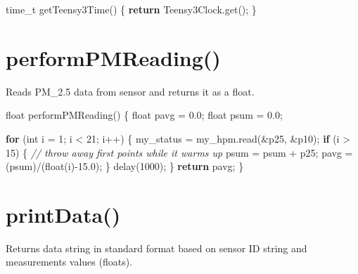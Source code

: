 \documentclass[]{book}
\newenvironment{Shaded}{\begin{snugshade}}{\end{snugshade}}
\newcommand{\CommentTok}[1]{\textcolor[rgb]{0.56,0.35,0.01}{\textit{#1}}}
\newcommand{\ControlFlowTok}[1]{\textcolor[rgb]{0.13,0.29,0.53}{\textbf{#1}}}
\newcommand{\DataTypeTok}[1]{\textcolor[rgb]{0.13,0.29,0.53}{#1}}
\newcommand{\DecValTok}[1]{\textcolor[rgb]{0.00,0.00,0.81}{#1}}
\newcommand{\FloatTok}[1]{\textcolor[rgb]{0.00,0.00,0.81}{#1}}
\newcommand{\NormalTok}[1]{#1}
\begin{document}
\begin{Shaded}
\begin{Highlighting}[]
\DataTypeTok{time_t}\NormalTok{ getTeensy3Time() \{}
  \ControlFlowTok{return}\NormalTok{ Teensy3Clock.get();}
\NormalTok{\}}
\end{Highlighting}
\end{Shaded}

\hypertarget{performpmreading}{%
\section*{performPMReading()}\label{performpmreading}}

Reads PM\_2.5 data from sensor and returns it as a float.

\begin{Shaded}
\begin{Highlighting}[]
\DataTypeTok{float}\NormalTok{ performPMReading() \{}
    \DataTypeTok{float}\NormalTok{ pavg = }\FloatTok{0.0}\NormalTok{;}
    \DataTypeTok{float}\NormalTok{ psum = }\FloatTok{0.0}\NormalTok{;}
    
    \ControlFlowTok{for}\NormalTok{ (}\DataTypeTok{int}\NormalTok{ i = }\DecValTok{1}\NormalTok{; i < }\DecValTok{21}\NormalTok{; i++) \{}
\NormalTok{      my_status = my_hpm.read(&p25, &p10);}
      \ControlFlowTok{if}\NormalTok{ (i > }\DecValTok{15}\NormalTok{) \{         }\CommentTok{// throw away first points while it warms up}
\NormalTok{          psum = psum + p25;}
\NormalTok{          pavg = (psum)/(}\DataTypeTok{float}\NormalTok{(i)-}\FloatTok{15.0}\NormalTok{);}
\NormalTok{          \}   }
\NormalTok{          delay(}\DecValTok{1000}\NormalTok{);    }
\NormalTok{    \}}
    \ControlFlowTok{return}\NormalTok{ pavg;}
\NormalTok{\}}
\end{Highlighting}
\end{Shaded}

\hypertarget{printdata}{%
\section*{printData()}\label{printdata}}

Returns data string in standard format based on sensor ID string and measurements values (floats).
\end{document}
